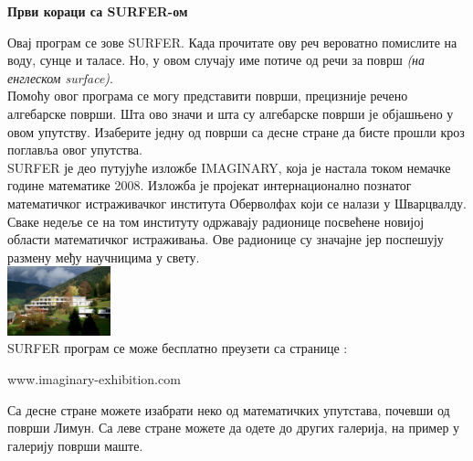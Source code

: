 \documentclass[sans]{amsart}
\newlength{\galIntroHeight}
\newlength{\galIntroWidth}
\newenvironment{surferGalIntroPage}{%
  \newpage
  \special{papersize=\galIntroHeight,\galIntroWidth}
  \pagecolor{textHgColor}
  \color{textFgColor}
  \thispagestyle{empty}
  \begin{flushleft}}%
  {\end{flushleft}}
\newenvironment{galTitle}{\bf}{

}
\newenvironment{surferText}{}{}
\begin{document}
\footnotesize
% 
%
\begin{surferGalIntroPage}
  \begin{galTitle}Први кораци са SURFER-ом\end{galTitle}
  \begin{surferText}
Овај програм се зове SURFER. Када прочитате ову реч вероватно помислите на воду, сунце и таласе. Но, у овом случају име потиче од речи за површ {\it (на енглеском surface)}.
\\
Помоћу овог програма се могу представити површи, прецизније речено алгебарске површи. Шта ово значи и шта су алгебарске површи је објашњено у овом упутству. Изаберите једну од површи са десне стране да бисте прошли кроз поглавља овог упутства.\\
SURFER је део путујуће изложбе IMAGINARY, која је настала током немачке године математике 2008. Изложба је пројекат интернационално познатог математичког истраживачког института Оберволфах који се налази у Шварцвалду. Сваке недеље се на том институту одржавају радионице посвећене новијој области математичког истраживања. Ове радионице су значајне јер поспешују размену међу научницима у свету.  \\
\vspace{0.2cm} \hspace{3.5cm}\includegraphics[width=3cm]{./../../common/images/photo_mfo.jpg}\\
SURFER програм се може  бесплатно преузети са странице : \\
\begin{centering}
www.imaginary-exhibition.com\\
\end{centering}
 \vspace{0.2cm}
Са десне стране можете изабрати неко од математичких упутстава, почевши од површи Лимун. Са леве стране можете да одете до других галерија, на пример у галерију површи маште.
   
     \end{surferText}
\end{surferGalIntroPage}
%
%
%
\end{document}
